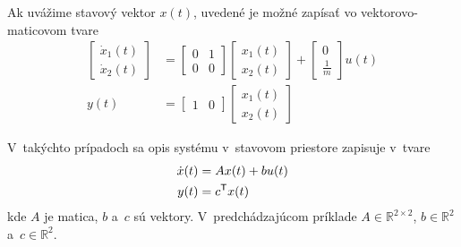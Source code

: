\documentclass[a4paper, 10pt, ]{article}
\begin{document}
Ak uvážime stavový vektor $x(t)$, uvedené je možné zapísať vo vektorovo-maticovom tvare
\begin{subequations}
    \begin{align}
        \begin{bmatrix}
            \dot x_1(t) \\ \dot x_2(t)
        \end{bmatrix}
        & =
        \begin{bmatrix}
            0 & 1 \\ 0 & 0
        \end{bmatrix}
        \begin{bmatrix}
            x_1(t) \\ x_2(t)
        \end{bmatrix}
        +
        \begin{bmatrix}
            0 \\ \frac{1}{m}
        \end{bmatrix}
        u(t)
        \\
        y(t)
        &=
        \begin{bmatrix}
            1 & 0
        \end{bmatrix}
        \begin{bmatrix}
            x_1(t) \\ x_2(t)
        \end{bmatrix}
    \end{align}
\end{subequations}

V~takýchto prípadoch sa opis systému v~stavovom priestore zapisuje v~tvare
\begin{subequations}
    \begin{align}
        \dot x(t) &= A x(t) + b u(t) \\
        y(t) &= c^{\mathsf{T}} x(t)
    \end{align}
\end{subequations}
kde $A$ je matica, $b$ a~$c$ sú vektory. V~predchádzajúcom príklade $A \in \mathbb R^{2\times 2}$, $b \in \mathbb R^{2}$ a~$c \in \mathbb R^{2}$. 








\nocite{*}

\printbibliography[title={Odporúčaná literatúra}]



\end{document}
